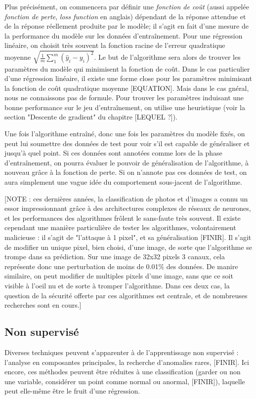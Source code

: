 Plus précisément, on commencera par définir une \emph{fonction de coût} (aussi appelée \emph{fonction de perte}, \emph{loss function} en anglais) dépendant de la réponse attendue et de la réponse réellement produite par le modèle; il s'agit en fait d'une mesure de la performance du modèle sur les données d'entraînement. Pour une régression linéaire, on choisit très souvent la fonction racine de l'erreur quadratique moyenne $\sqrt{\frac{1}{m}\sum_1^m(\hat y_i - y_i)^2}$.
Le but de l'algorithme sera alors de trouver les paramètres du modèle qui minimisent la fonction de coût. Dans le cas particulier d'une régression linéaire, il existe une forme close pour les paramètres minimisant la fonction de coût quadratique moyenne [EQUATION]. Mais dans le cas gnéral, nous ne connaissons pas de formule. Pour trouver les paramètres induisant une bonne performance sur le jeu d'entraînement, on utilise une heuristique (voir la section "Descente de gradient" du chapitre [LEQUEL ?]).

Une fois l'algorithme entraîné, donc une fois les paramètres du modèle fixés, on peut lui soumettre des données de test pour voir s'il est capable de généraliser et jusqu'à quel point. Si ces données sont annotées comme lors de la phase d'entraînement, on pourra évaluer le pouvoir de généralisation de l'algorithme, à nouveau grâce à la fonction de perte. Si on n'annote pas ces données de test, on aura simplement une vague idée du comportement sous-jacent de l'algorithme.

[NOTE : ces dernières années, la classification de photos et d'images a connu un essor impressionnant grâce à des architectures complexes de réseaux de neurones, et les performances des algorithmes frôlent le sans-faute très souvent. Il existe cependant une manière particulière de tester les algorithmes, volontairement malicieuse : il s'agit de "l'attaque à 1 pixel", et sa généralisation [FINIR]. Il s'agit de modifier un unique pixel, bien choisi, d'une image, de sorte que l'algorithme se trompe dans sa prédiction. Sur une image de 32x32 pixels 3 canaux, cela représente donc une perturbation de moins de 0.01\% des données. De manire similaire, on peut modifier de multiples pixels d'une image, sans que ce soit visible à l'oeil nu et de sorte à tromper l'algorithme. Dans ces deux cas, la question de la sécurité offerte par ces algorithmes est centrale, et de nombreuses recherches sont en cours.]

\subsection{Non supervisé}
Diverses techniques peuvent s'apparenter à de l'apprentissage non supervisé : l'analyse en composantes principales, la recherche d'anomalies rares, [FINIR]. Ici encore, ces méthodes peuvent être réduites à une classification (garder ou non une variable, considérer un point comme normal ou anormal, [FINIR]), laquelle peut elle-même être le fruit d'une régression.

